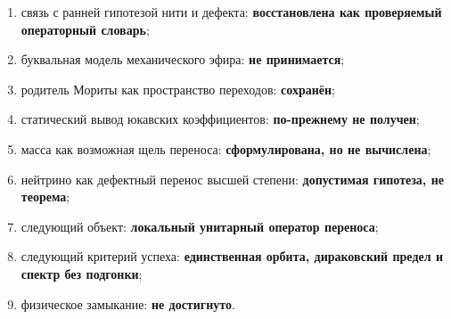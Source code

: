 \begin{protocol}
\begin{enumerate}
 \item связь с ранней гипотезой нити и дефекта:
 \textbf{восстановлена как проверяемый операторный словарь};
 \item буквальная модель механического эфира:
 \textbf{не принимается};
 \item родитель Мориты как пространство переходов:
 \textbf{сохранён};
 \item статический вывод юкавских коэффициентов:
 \textbf{по-прежнему не получен};
 \item масса как возможная щель переноса:
 \textbf{сформулирована, но не вычислена};
 \item нейтрино как дефектный перенос высшей степени:
 \textbf{допустимая гипотеза, не теорема};
 \item следующий объект:
 \textbf{локальный унитарный оператор переноса};
 \item следующий критерий успеха:
 \textbf{единственная орбита, дираковский предел и спектр без подгонки};
 \item физическое замыкание:
 \textbf{не достигнуто}.
\end{enumerate}
\end{protocol}
